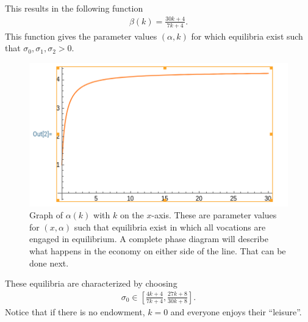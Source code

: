 \documentclass[12pt,letterpaper]{article}
\begin{document}
	This results in the following function  
	\begin{align}
		\beta(k)=\frac{30k+4}{7k+4}.\label{alpha parameterized}
	\end{align}
	This function gives the parameter values $(\alpha,k)$ for which equilibria exist such that $\sigma_0,\sigma_1,\sigma_2>0$. 
	
	\begin{figure}[h]
		\centering
		\includegraphics[width=1.0\textwidth]{Alpha of k}
		\caption{Graph of $\alpha(k)$ with $k$ on the $x$-axis. These are parameter values for $(x,\alpha)$ such that equilibria exist in which all vocations are engaged in equilibrium. A complete phase diagram will describe what happens in the economy on either side of the line. That can be done next.}
		\label{fig:my_label}
	\end{figure}
	
	
	
	
	These equilibria are characterized by choosing  
	\begin{align}
		\sigma_0\in\left[\frac{4k+4}{7k+4},\frac{27k+8}{30k+8}\right].\label{Paramter Constraints 2}
	\end{align}
	Notice that if there is no endowment, $k=0$ and everyone enjoys their ``leisure''.
	
	
	
	
	
%	
	
	
	
\end{document}
